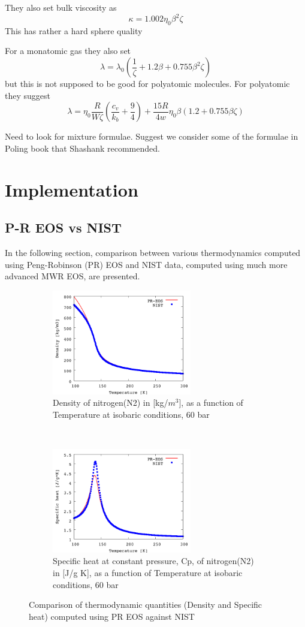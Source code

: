 \documentclass[11pt]{article}
\begin{document}
They also set bulk viscosity as
\[
\kappa = 1.002 \eta_0 \beta^2 \zeta
\]
This has rather a hard sphere quality

For a monatomic gas they also set
\[
\lambda = \lambda_0 (\frac{1}{\zeta} + 1.2 \beta + 0.755 \beta^2 \zeta)
\]
but this is not supposed to be good for polyatomic molecules.
For polyatomic they suggest
\[
\lambda = \eta_0 \frac{R}{W \zeta} \left(\frac{c_v}{k_b} + \frac{9}{4} \right)
+ \frac{15 R}{4 w} \eta_0 \beta \left( 1.2 + 0.755 \beta \zeta \right ) 
\]

Need to look for mixture formulae.  Suggest we consider some of the formulae in Poling book that Shashank
recommended.
    \section{Implementation}
    \subsection {P-R EOS vs NIST}
    \label{sec:ComparePRvsNIST}
    In the following section, comparison between various thermodynamics computed using Peng-Robinson (PR) EOS and NIST data, computed using much more advanced MWR EOS, are presented. 
\begin{figure}[t!]
    \centering
    \begin{subfigure}[t]{0.5\textwidth}
        \centering
        \includegraphics[height=1.8in]{figures/N2_vsNIST_Density.png}
        \caption{Density of nitrogen(N2) in [kg/$m^{3}$], as a function of Temperature at isobaric conditions, 60 bar}
    \end{subfigure}%
    ~ 
    \begin{subfigure}[t]{0.5\textwidth}
        \centering
        \includegraphics[height=1.8in]{figures/N2_vsNIST_Cp.png}
        \caption{Specific heat at constant pressure, Cp, of nitrogen(N2) in [J/g K], as a function of Temperature at isobaric conditions, 60 bar}
    \end{subfigure}
    \caption{Comparison of thermodynamic quantities (Density and Specific heat) computed using PR EOS against NIST}
    \label{fig:DensityCpVsNIST}
\end{figure}
\end{document}
